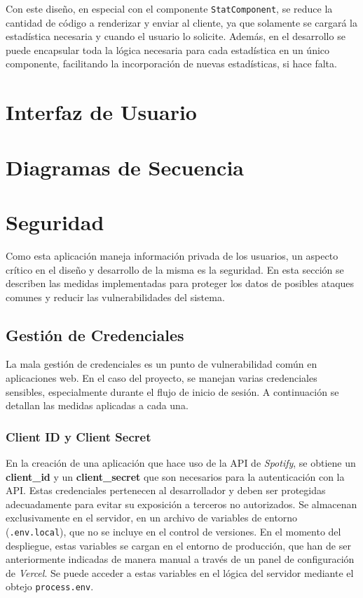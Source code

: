 Con este diseño, en especial con el componente \texttt{StatComponent}, se reduce la cantidad de código a renderizar y enviar al cliente, ya que solamente se cargará la estadística necesaria y cuando el usuario lo solicite. Además, en el desarrollo se puede encapsular toda la lógica necesaria para cada estadística en un único componente, facilitando la incorporación de nuevas estadísticas, si hace falta.




\section{Interfaz de Usuario}

\section{Diagramas de Secuencia}




\section{Seguridad}

Como esta aplicación maneja información privada de los usuarios, un aspecto crítico en el diseño y desarrollo de la misma es la seguridad. En esta sección se describen las medidas implementadas para proteger los datos de posibles ataques comunes y reducir las vulnerabilidades del sistema.

\subsection{Gestión de Credenciales}

La mala gestión de credenciales es un punto de vulnerabilidad común en aplicaciones web. En el caso del proyecto, se manejan varias credenciales sensibles, especialmente durante el flujo de inicio de sesión. A continuación se detallan las medidas aplicadas a cada una.

\subsubsection*{Client ID y Client Secret}

En la creación de una aplicación que hace uso de la API de \textit{Spotify}, se obtiene un \textbf{client\_id} y un \textbf{client\_secret} que son necesarios para la autenticación con la API. Estas credenciales pertenecen al desarrollador y deben ser protegidas adecuadamente para evitar su exposición a terceros no autorizados. Se almacenan exclusivamente en el servidor, en un archivo de variables de entorno (\texttt{.env.local}), que no se incluye en el control de versiones. En el momento del despliegue, estas variables se cargan en el entorno de producción, que han de ser anteriormente indicadas de manera manual a través de un panel de configuración de \textit{Vercel}. Se puede acceder a estas variables en el lógica del servidor mediante el obtejo \texttt{process.env}.

